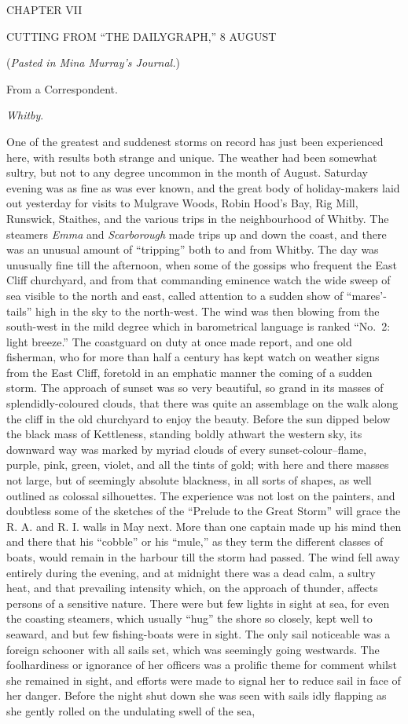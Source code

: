 \documentclass[12pt,openright]{book}
\begin{document}
CHAPTER VII

CUTTING FROM “THE DAILYGRAPH,” 8 AUGUST

(\textit{Pasted in Mina Murray’s Journal.})

From a Correspondent.

\textit{Whitby}.

One of the greatest and suddenest storms on record has just been experienced here, with results both strange and unique. The weather had been somewhat sultry, but not to any degree uncommon in the month of August. Saturday evening was as fine as was ever known, and the great body of holiday-makers laid out yesterday for visits to Mulgrave Woods, Robin Hood’s Bay, Rig Mill, Runswick, Staithes, and the various trips in the neighbourhood of Whitby. The steamers \textit{Emma} and \textit{Scarborough} made trips up and down the coast, and there was an unusual amount of “tripping” both to and from Whitby. The day was unusually fine till the afternoon, when some of the gossips who frequent the East Cliff churchyard, and from that commanding eminence watch the wide sweep of sea visible to the north and east, called attention to a sudden show of “mares’-tails” high in the sky to the north-west. The wind was then blowing from the south-west in the mild degree which in barometrical language is ranked “No. 2: light breeze.” The coastguard on duty at once made report, and one old fisherman, who for more than half a century has kept watch on weather signs from the East Cliff, foretold in an emphatic manner the coming of a sudden storm. The approach of sunset was so very beautiful, so grand in its masses of splendidly-coloured clouds, that there was quite an assemblage on the walk along the cliff in the old churchyard to enjoy the beauty. Before the sun dipped below the black mass of Kettleness, standing boldly athwart the western sky, its downward way was marked by myriad clouds of every sunset-colour–flame, purple, pink, green, violet, and all the tints of gold; with here and there masses not large, but of seemingly absolute blackness, in all sorts of shapes, as well outlined as colossal silhouettes. The experience was not lost on the painters, and doubtless some of the sketches of the “Prelude to the Great Storm” will grace the R. A. and R. I. walls in May next. More than one captain made up his mind then and there that his “cobble” or his “mule,” as they term the different classes of boats, would remain in the harbour till the storm had passed. The wind fell away entirely during the evening, and at midnight there was a dead calm, a sultry heat, and that prevailing intensity which, on the approach of thunder, affects persons of a sensitive nature. There were but few lights in sight at sea, for even the coasting steamers, which usually “hug” the shore so closely, kept well to seaward, and but few fishing-boats were in sight. The only sail noticeable was a foreign schooner with all sails set, which was seemingly going westwards. The foolhardiness or ignorance of her officers was a prolific theme for comment whilst she remained in sight, and efforts were made to signal her to reduce sail in face of her danger. Before the night shut down she was seen with sails idly flapping as she gently rolled on the undulating swell of the sea,
\end{document}
